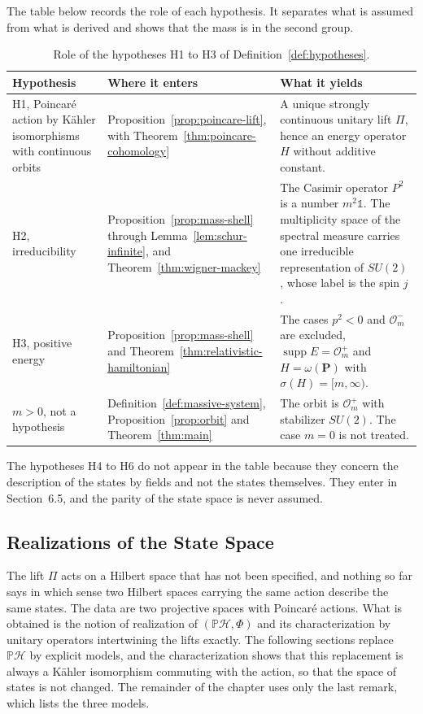 The table below records the role of each hypothesis. It separates what is assumed from what is derived and shows that the mass is in the second group.

\begin{table}[h!]
	\centering
	\begin{tabular}{p{3.1cm}p{4.6cm}p{6.1cm}}
		\hline
		\textbf{Hypothesis} & \textbf{Where it enters} & \textbf{What it yields} \\
		\hline
		H1, Poincar\'e action by Kähler isomorphisms with continuous orbits
		& Proposition~\ref{prop:poincare-lift}, with Theorem~\ref{thm:poincare-cohomology}
		& A unique strongly continuous unitary lift $\Pi$, hence an energy operator $H$ without additive constant. \\
		H2, irreducibility
		& Proposition~\ref{prop:mass-shell} through Lemma~\ref{lem:schur-infinite}, and Theorem~\ref{thm:wigner-mackey}
		& The Casimir operator $P^2$ is a number $m^2\mathbb{1}$. The multiplicity space of the spectral measure carries one irreducible representation of $SU(2)$, whose label is the spin $j$. \\
		H3, positive energy
		& Proposition~\ref{prop:mass-shell} and Theorem~\ref{thm:relativistic-hamiltonian}
		& The cases $p^2<0$ and $\mathcal{O}_m^-$ are excluded, $\operatorname{supp}E=\mathcal{O}_m^+$ and $H=\omega(\mathbf{P})$ with $\sigma(H)=[m,\infty)$. \\
		$m>0$, not a hypothesis
		& Definition~\ref{def:massive-system}, Proposition~\ref{prop:orbit} and Theorem~\ref{thm:main}
		& The orbit is $\mathcal{O}_m^+$ with stabilizer $SU(2)$. The case $m=0$ is not treated. \\
		\hline
	\end{tabular}
	\caption{Role of the hypotheses H1 to H3 of Definition~\ref{def:hypotheses}.}
	\label{tab:hypotheses-roles}
\end{table}

The hypotheses H4 to H6 do not appear in the table because they concern the description of the states by fields and not the states themselves. They enter in Section~6.5, and the parity of the state space is never assumed.

\subsection{Realizations of the State Space}

The lift $\Pi$ acts on a Hilbert space that has not been specified, and nothing so far says in which sense two Hilbert spaces carrying the same action describe the same states. The data are two projective spaces with Poincar\'e actions. What is obtained is the notion of realization of $(\mathbb{P}\mathcal{H},\Phi)$ and its characterization by unitary operators intertwining the lifts exactly. The following sections replace $\mathbb{P}\mathcal{H}$ by explicit models, and the characterization shows that this replacement is always a Kähler isomorphism commuting with the action, so that the space of states is not changed. The remainder of the chapter uses only the last remark, which lists the three models.

